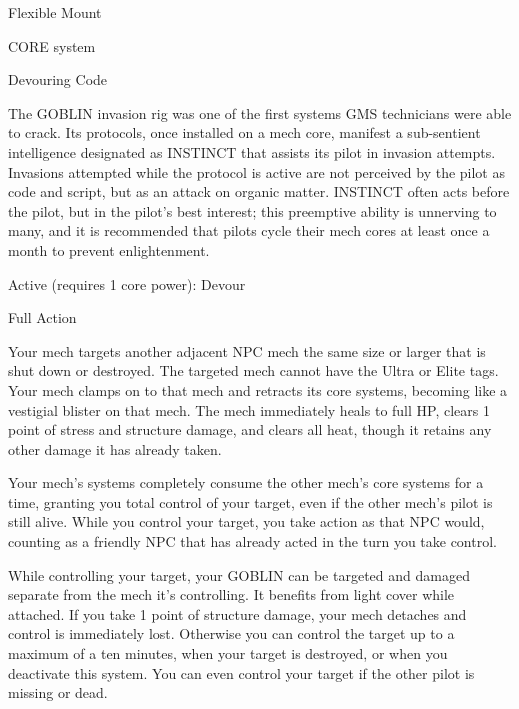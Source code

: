   Flexible Mount 

                                                CORE system 

                                                                                                          


                                                  Devouring Code  

  The GOBLIN invasion rig was one of the first systems GMS technicians were able to crack. Its  
  protocols, once installed on a mech core, manifest a sub-sentient intelligence designated as INSTINCT  
  that assists its pilot in invasion attempts. Invasions attempted while the protocol is active are not  
  perceived by the pilot as code and script, but as an attack on organic matter. INSTINCT often acts  
  before the pilot, but in the pilot’s best interest; this preemptive ability is unnerving to many, and it is  
  recommended that pilots cycle their mech cores at least once a month to prevent enlightenment.     

  Active (requires 1 core power): Devour
 
  Full Action
 
  Your mech targets another adjacent NPC mech the same size or larger that is shut down or destroyed.  
  The targeted mech cannot have the Ultra or Elite tags. Your mech clamps on to that mech and retracts  
  its core systems, becoming like a vestigial blister on that mech. The mech immediately heals to full HP,  
  clears 1 point of stress and structure damage, and clears all heat, though it retains any other damage it  
  has already taken.
 

  Your mech’s systems completely consume the other mech’s core systems for a time, granting you total  
  control of your target, even if the other mech’s pilot is still alive. While you control your target, you take  
  action as that NPC would, counting as a friendly NPC that has already acted in the turn you take  
  control.
 

  While controlling your target, your GOBLIN can be targeted and damaged separate from the mech it’s  
  controlling. It benefits from light cover while attached. If you take 1 point of structure damage, your  
  mech detaches and control is immediately lost. Otherwise you can control the target up to a maximum  
  of a ten minutes, when your target is destroyed, or when you deactivate this system. You can even  
  control your target if the other pilot is missing or dead. 

